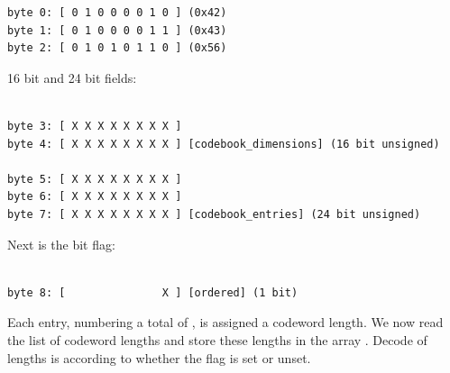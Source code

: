 \begin{Verbatim}[commandchars=\\\{\}]
byte 0: [ 0 1 0 0 0 0 1 0 ] (0x42)
byte 1: [ 0 1 0 0 0 0 1 1 ] (0x43)
byte 2: [ 0 1 0 1 0 1 1 0 ] (0x56)
\end{Verbatim}

16 bit  and 24 bit  fields:

\begin{Verbatim}[commandchars=\\\{\}]

byte 3: [ X X X X X X X X ]
byte 4: [ X X X X X X X X ] [codebook_dimensions] (16 bit unsigned)

byte 5: [ X X X X X X X X ]
byte 6: [ X X X X X X X X ]
byte 7: [ X X X X X X X X ] [codebook_entries] (24 bit unsigned)

\end{Verbatim}

Next is the \varname{[ordered]} bit flag:

\begin{Verbatim}[commandchars=\\\{\}]

byte 8: [               X ] [ordered] (1 bit)

\end{Verbatim}

Each entry, numbering a
total of , is assigned a codeword length.
We now read the list of codeword lengths and store these lengths in
the array . Decode of lengths is
according to whether the \varname{[ordered]} flag is set or unset.

